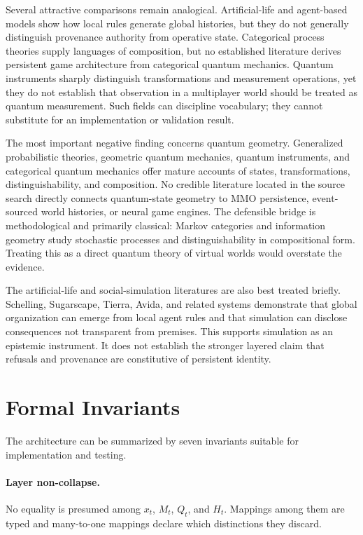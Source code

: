 \documentclass[11pt]{article}
\begin{document}
Several attractive comparisons remain analogical. Artificial-life and agent-based models show how local rules generate global histories, but they do not generally distinguish provenance authority from operative state. Categorical process theories supply languages of composition, but no established literature derives persistent game architecture from categorical quantum mechanics. Quantum instruments sharply distinguish transformations and measurement operations, yet they do not establish that observation in a multiplayer world should be treated as quantum measurement. Such fields can discipline vocabulary; they cannot substitute for an implementation or validation result.

The most important negative finding concerns quantum geometry. Generalized probabilistic theories, geometric quantum mechanics, quantum instruments, and categorical quantum mechanics offer mature accounts of states, transformations, distinguishability, and composition. No credible literature located in the source search directly connects quantum-state geometry to MMO persistence, event-sourced world histories, or neural game engines. The defensible bridge is methodological and primarily classical: Markov categories and information geometry study stochastic processes and distinguishability in compositional form. Treating this as a direct quantum theory of virtual worlds would overstate the evidence.

The artificial-life and social-simulation literatures are also best treated briefly. Schelling, Sugarscape, Tierra, Avida, and related systems demonstrate that global organization can emerge from local agent rules and that simulation can disclose consequences not transparent from premises. This supports simulation as an epistemic instrument. It does not establish the stronger layered claim that refusals and provenance are constitutive of persistent identity.

\section{Formal Invariants}

The architecture can be summarized by seven invariants suitable for implementation and testing.

\paragraph{Layer non-collapse.} No equality is presumed among $x_t$, $M_t$, $Q_t$, and $H_t$. Mappings among them are typed and many-to-one mappings declare which distinctions they discard.
\end{document}

